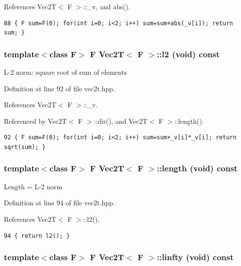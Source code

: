 References Vec2T$<$ F $>$::\_\-v, and abs().

\footnotesize\begin{verbatim}88 { F sum=F(0); for(int i=0; i<2; i++) sum=sum+abs(_v[i]); return sum; }
\end{verbatim}\normalsize 


\subsubsection{\setlength{\rightskip}{0pt plus 5cm}template$<$class F$>$ F {\bf Vec2T}$<$ F $>$::l2 (void) const\hspace{0.3cm}{\tt  [inline]}}\label{classVec2T_ba4174b2dda6a79f2501cbc9eaf2c3a0_ba4174b2dda6a79f2501cbc9eaf2c3a0}


L-2 norm: square root of sum of elements 

Definition at line 92 of file vec2t.hpp.

References Vec2T$<$ F $>$::\_\-v.

Referenced by Vec2T$<$ F $>$::dir(), and Vec2T$<$ F $>$::length().

\footnotesize\begin{verbatim}92 { F sum=F(0); for(int i=0; i<2; i++) sum=sum+_v[i]*_v[i]; return sqrt(sum); }
\end{verbatim}\normalsize 


\subsubsection{\setlength{\rightskip}{0pt plus 5cm}template$<$class F$>$ F {\bf Vec2T}$<$ F $>$::length (void) const\hspace{0.3cm}{\tt  [inline]}}\label{classVec2T_e9614187f8e8bc75460d63171193e93c_e9614187f8e8bc75460d63171193e93c}


Length = L-2 norm 

Definition at line 94 of file vec2t.hpp.

References Vec2T$<$ F $>$::l2().

\footnotesize\begin{verbatim}94 { return l2(); }
\end{verbatim}\normalsize 


\subsubsection{\setlength{\rightskip}{0pt plus 5cm}template$<$class F$>$ F {\bf Vec2T}$<$ F $>$::linfty (void) const\hspace{0.3cm}{\tt  [inline]}}\label{classVec2T_c7a97570bd6556e3c5b1880cdd762fe7_c7a97570bd6556e3c5b1880cdd762fe7}


